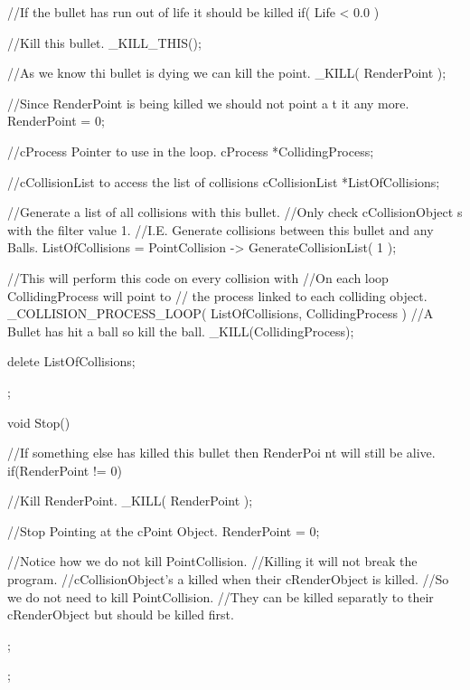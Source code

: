 \begin{DoxyCode}
{{                //If the bullet has run out of life it should be killed
                if( Life < 0.0 )
                {
                        //Kill this bullet.
                        _KILL_THIS();

                        //As we know thi bullet is dying we can kill the point.
                        _KILL( RenderPoint );

                        //Since RenderPoint is being killed we should not point a
      t it any more.
                        RenderPoint = 0;
                }

                //cProcess Pointer to use in the loop.
                cProcess *CollidingProcess;

                //cCollisionList to access the list of collisions
                cCollisionList *ListOfCollisions;

                //Generate a list of all collisions with this bullet.
                //Only check cCollisionObject s with the filter value 1.
                //I.E. Generate collisions between this bullet and any Balls.
                ListOfCollisions = PointCollision -> GenerateCollisionList( 1 );

                //This will perform this code on every collision with
                //On each loop CollidingProcess will point to
                // the process linked to each colliding object.
                _COLLISION_PROCESS_LOOP( ListOfCollisions, CollidingProcess )
                {
                        //A Bullet has hit a ball so kill the ball.
                        _KILL(CollidingProcess);
                }

                delete ListOfCollisions;
   };

   void Stop()
   {
                        //If something else has killed this bullet then RenderPoi
      nt will still be alive.
                if(RenderPoint != 0)
                {
                        //Kill RenderPoint.
                        _KILL( RenderPoint );

                        //Stop Pointing at the cPoint Object.
                        RenderPoint = 0;

                        //Notice how we do not kill PointCollision.
                        //Killing it will not break the program.
                        //cCollisionObject's a killed when their cRenderObject is
       killed.
                        //So we do not need to kill PointCollision.
                        //They can be killed separatly to their cRenderObject but
       should be killed first.
                }
   };
};


\end{DoxyCode}
